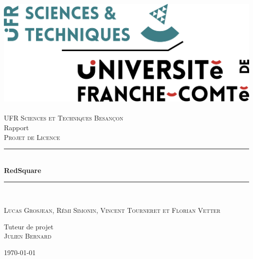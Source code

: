 \documentclass[a4paper, 12pt, twoside]{article}
\begin{document}
\begin{titlepage}
\begin{center}

\includegraphics[scale=0.50]{./TitlePage/LOGOST}~\\[1cm]

\textsc{\LARGE UFR Sciences et Techniques  Besançon}\\[1.5cm]
Rapport\\
\textsc{Projet de Licence}

\newcommand{\HRule}{\rule{\linewidth}{0.5mm}}

\HRule \\[0.4cm]

{\huge \bfseries RedSquare}

\HRule \\[1.5cm]

\end{center}
\begin{minipage}{0.9\textwidth}
\begin{center} \large

\textsc{Lucas Grosjean, }
\textsc{Rémi Simonin, }
\textsc{Vincent Tourneret}
\textsc{et Florian Vetter}
\end{center}
\end{minipage}
\newline

\begin{center} \large
Tuteur de projet\\
\textsc{Julien Bernard}
\end{center}

\vfill

\begin{center}
{\large \today}
\end{center}

\end{titlepage}

\newpage
\end{document}
